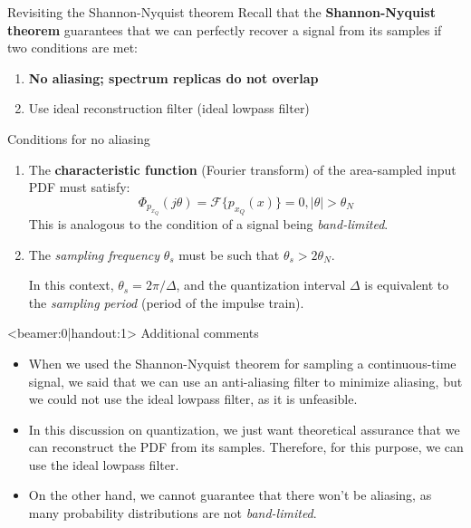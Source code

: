\documentclass[10pt]{beamer}
\begin{document}
%
\begin{frame}{Revisiting the Shannon-Nyquist theorem}
	Recall that the \textbf{Shannon-Nyquist theorem} guarantees that we can perfectly recover a signal from its samples if two conditions are met:
	\begin{enumerate}
		\item \textbf{No aliasing; spectrum replicas do not overlap}
		\item Use ideal reconstruction filter (ideal lowpass filter)
	\end{enumerate}
	\pause
	\begin{block}{Conditions for no aliasing}
		\begin{enumerate}
			\item The \textbf{characteristic function} (Fourier transform) of the area-sampled input PDF must satisfy: 
			\begin{equation*}
				\Phi_{p_{x_Q}}(j\theta) = \mathcal{F}\{p_{x_Q}(x)\} = 0, |\theta| > \theta_N
			\end{equation*}
			This is analogous to the condition of a signal being \textit{band-limited}.
			\item\pause The \textit{sampling frequency} $\theta_s$ must be such that $\theta_s > 2\theta_N$.
			
			In this context, $\theta_s = 2\pi/\Delta$, and the quantization interval $\Delta$ is equivalent to the \textit{sampling period} (period of the impulse train).
		\end{enumerate}
	\end{block}
\end{frame}

%
\begin{frame}<beamer:0|handout:1>
Additional comments
\begin{itemize}
	\item When we used the Shannon-Nyquist theorem for sampling a continuous-time signal, we said that we can use an anti-aliasing filter to minimize aliasing, but we could not use the ideal lowpass filter, as it is unfeasible.
	\item In this discussion on quantization, we just want theoretical assurance that we can reconstruct the PDF from its samples. Therefore, for this purpose, we can use the ideal lowpass filter.
	\item On the other hand, we cannot guarantee that there won't be aliasing, as many probability distributions are not \textit{band-limited}.
\end{itemize}
\end{frame}
\end{document}
